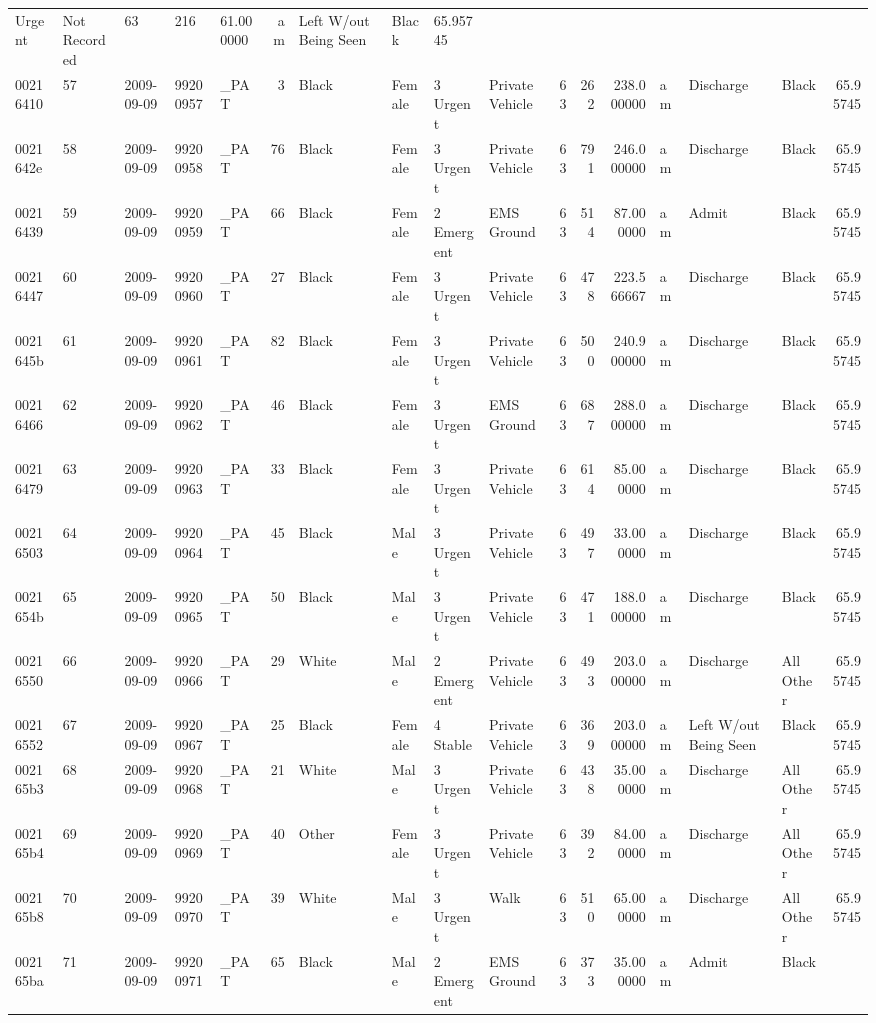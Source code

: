 \documentclass[]{elsarticle} %
\begin{document}
\begin{longtable}[]{@{}lllllrllllrrrlllr@{}}
Urgent & Not Recorded & 63 & 216 & 61.000000 & am & Left W/out Being
Seen & Black & 65.95745\tabularnewline
00216410 & 57 & 2009-09-09 & 99200957 & \_PAT & 3 & Black & Female & 3
Urgent & Private Vehicle & 63 & 262 & 238.000000 & am & Discharge &
Black & 65.95745\tabularnewline
0021642e & 58 & 2009-09-09 & 99200958 & \_PAT & 76 & Black & Female & 3
Urgent & Private Vehicle & 63 & 791 & 246.000000 & am & Discharge &
Black & 65.95745\tabularnewline
00216439 & 59 & 2009-09-09 & 99200959 & \_PAT & 66 & Black & Female & 2
Emergent & EMS Ground & 63 & 514 & 87.000000 & am & Admit & Black &
65.95745\tabularnewline
00216447 & 60 & 2009-09-09 & 99200960 & \_PAT & 27 & Black & Female & 3
Urgent & Private Vehicle & 63 & 478 & 223.566667 & am & Discharge &
Black & 65.95745\tabularnewline
0021645b & 61 & 2009-09-09 & 99200961 & \_PAT & 82 & Black & Female & 3
Urgent & Private Vehicle & 63 & 500 & 240.900000 & am & Discharge &
Black & 65.95745\tabularnewline
00216466 & 62 & 2009-09-09 & 99200962 & \_PAT & 46 & Black & Female & 3
Urgent & EMS Ground & 63 & 687 & 288.000000 & am & Discharge & Black &
65.95745\tabularnewline
00216479 & 63 & 2009-09-09 & 99200963 & \_PAT & 33 & Black & Female & 3
Urgent & Private Vehicle & 63 & 614 & 85.000000 & am & Discharge & Black
& 65.95745\tabularnewline
00216503 & 64 & 2009-09-09 & 99200964 & \_PAT & 45 & Black & Male & 3
Urgent & Private Vehicle & 63 & 497 & 33.000000 & am & Discharge & Black
& 65.95745\tabularnewline
0021654b & 65 & 2009-09-09 & 99200965 & \_PAT & 50 & Black & Male & 3
Urgent & Private Vehicle & 63 & 471 & 188.000000 & am & Discharge &
Black & 65.95745\tabularnewline
00216550 & 66 & 2009-09-09 & 99200966 & \_PAT & 29 & White & Male & 2
Emergent & Private Vehicle & 63 & 493 & 203.000000 & am & Discharge &
All Other & 65.95745\tabularnewline
00216552 & 67 & 2009-09-09 & 99200967 & \_PAT & 25 & Black & Female & 4
Stable & Private Vehicle & 63 & 369 & 203.000000 & am & Left W/out Being
Seen & Black & 65.95745\tabularnewline
002165b3 & 68 & 2009-09-09 & 99200968 & \_PAT & 21 & White & Male & 3
Urgent & Private Vehicle & 63 & 438 & 35.000000 & am & Discharge & All
Other & 65.95745\tabularnewline
002165b4 & 69 & 2009-09-09 & 99200969 & \_PAT & 40 & Other & Female & 3
Urgent & Private Vehicle & 63 & 392 & 84.000000 & am & Discharge & All
Other & 65.95745\tabularnewline
002165b8 & 70 & 2009-09-09 & 99200970 & \_PAT & 39 & White & Male & 3
Urgent & Walk & 63 & 510 & 65.000000 & am & Discharge & All Other &
65.95745\tabularnewline
002165ba & 71 & 2009-09-09 & 99200971 & \_PAT & 65 & Black & Male & 2
Emergent & EMS Ground & 63 & 373 & 35.000000 & am & Admit & Black &

\end{longtable}
\end{document}
